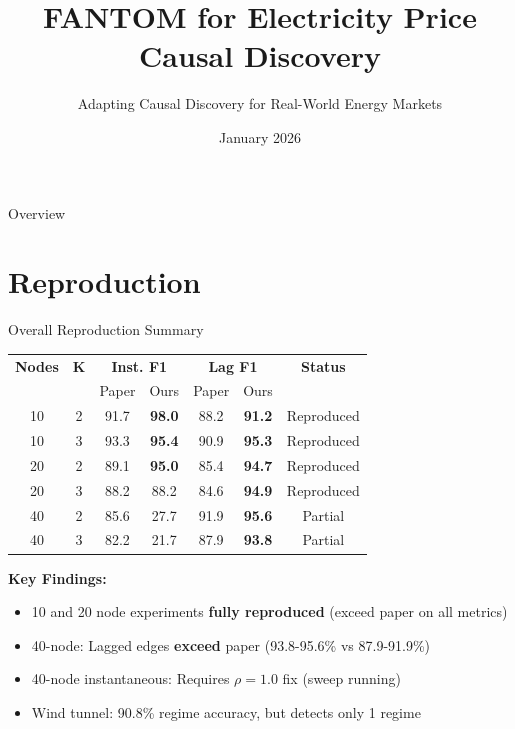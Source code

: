\documentclass[aspectratio=169]{beamer}
\title{FANTOM for Electricity Price Causal Discovery}
\subtitle{Adapting Causal Discovery for Real-World Energy Markets}
\date{January 2026}
\begin{document}
\begin{frame}
\titlepage
\end{frame}

\begin{frame}{Overview}
\tableofcontents
\end{frame}

\section{Reproduction}

\begin{frame}{Overall Reproduction Summary}
\begin{table}
\centering
\small
\begin{tabular}{c|c|cc|cc|c}
\toprule
\textbf{Nodes} & \textbf{K} & \multicolumn{2}{c|}{\textbf{Inst. F1}} & \multicolumn{2}{c|}{\textbf{Lag F1}} & \textbf{Status} \\
& & Paper & Ours & Paper & Ours & \\
\midrule
10 & 2 & 91.7 & \textcolor{reprogreen}{\textbf{98.0}} & 88.2 & \textcolor{reprogreen}{\textbf{91.2}} & \textcolor{reprogreen}{Reproduced} \\
10 & 3 & 93.3 & \textcolor{reprogreen}{\textbf{95.4}} & 90.9 & \textcolor{reprogreen}{\textbf{95.3}} & \textcolor{reprogreen}{Reproduced} \\
20 & 2 & 89.1 & \textcolor{reprogreen}{\textbf{95.0}} & 85.4 & \textcolor{reprogreen}{\textbf{94.7}} & \textcolor{reprogreen}{Reproduced} \\
20 & 3 & 88.2 & 88.2 & 84.6 & \textcolor{reprogreen}{\textbf{94.9}} & \textcolor{reprogreen}{Reproduced} \\
40 & 2 & 85.6 & \textcolor{warnred}{27.7} & 91.9 & \textcolor{reprogreen}{\textbf{95.6}} & \textcolor{warnred}{Partial} \\
40 & 3 & 82.2 & \textcolor{warnred}{21.7} & 87.9 & \textcolor{reprogreen}{\textbf{93.8}} & \textcolor{warnred}{Partial} \\
\bottomrule
\end{tabular}
\end{table}

\vspace{0.3cm}
\textbf{Key Findings:}
\begin{itemize}
    \item 10 and 20 node experiments \textbf{fully reproduced} (exceed paper on all metrics)
    \item 40-node: Lagged edges \textbf{exceed} paper (93.8-95.6\% vs 87.9-91.9\%)
    \item 40-node instantaneous: Requires $\rho=1.0$ fix (sweep running)
    \item Wind tunnel: 90.8\% regime accuracy, but detects only 1 regime
\end{itemize}
\end{frame}
\end{document}
